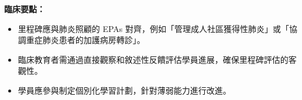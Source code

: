 \documentclass[12pt,a4paper]{article}
\begin{document}
\begin{importantbox}
\textbf{臨床要點：}
\begin{itemize}[nosep]
    \item 里程碑應與肺炎照顧的 EPAs 對齊，例如「管理成人社區獲得性肺炎」或「協調重症肺炎患者的加護病房轉診」。
    \item 臨床教育者需通過直接觀察和敘述性反饋評估學員進展，確保里程碑評估的客觀性。
    \item 學員應參與制定個別化學習計劃，針對薄弱能力進行改進。
\end{itemize}
\end{importantbox}
\end{document}
